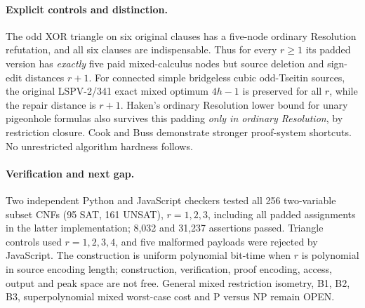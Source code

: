 \documentclass[11pt]{article}
\begin{document}
\paragraph{Explicit controls and distinction.}
The odd XOR triangle on six original clauses has a five-node ordinary Resolution refutation, and all six clauses are indispensable. Thus for every $r\ge1$ its padded version has \emph{exactly} five paid mixed-calculus nodes but source deletion and sign-edit distances $r+1$. For connected simple bridgeless cubic odd-Tseitin sources, the original LSPV-2/341 exact mixed optimum $4h-1$ is preserved for all $r$, while the repair distance is $r+1$. Haken's ordinary Resolution lower bound for unary pigeonhole formulas also survives this padding \emph{only in ordinary Resolution}, by restriction closure. Cook and Buss demonstrate stronger proof-system shortcuts. No unrestricted algorithm hardness follows.
\paragraph{Verification and next gap.}
Two independent Python and JavaScript checkers tested all 256 two-variable subset CNFs (95 SAT, 161 UNSAT), $r=1,2,3$, including all padded assignments in the latter implementation; 8,032 and 31,237 assertions passed. Triangle controls used $r=1,2,3,4$, and five malformed payloads were rejected by JavaScript. The construction is uniform polynomial bit-time when $r$ is polynomial in source encoding length; construction, verification, proof encoding, access, output and peak space are not free. General mixed restriction isometry, B1, B2, B3, superpolynomial mixed worst-case cost and P versus NP remain OPEN.
\end{document}
